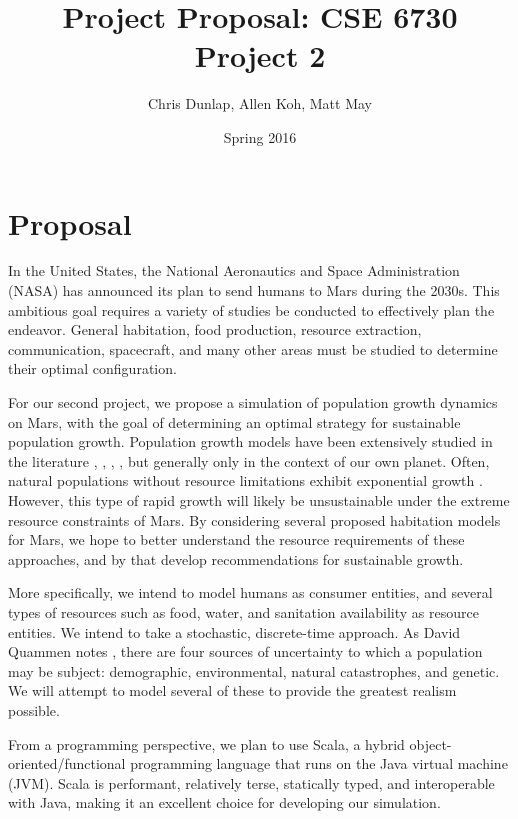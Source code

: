 \documentclass[12pt]{article}
\title{Project Proposal: CSE 6730 Project 2}
\author{Chris Dunlap, Allen Koh, Matt May}
\date{Spring 2016}
\begin{document}
\begin{titlepage}
  \maketitle
  \thispagestyle{empty}
\end{titlepage}

\newpage
  \tableofcontents
  \thispagestyle{empty}
\newpage

\section{Proposal}
\label{sec:proposal}

In the United States, the National Aeronautics and Space Administration (NASA)
has announced its plan to send humans to Mars during the 2030s. This ambitious
goal requires a variety of studies be conducted to effectively plan the
endeavor. General habitation, food production, resource extraction,
communication, spacecraft, and many other areas must be studied to determine
their optimal configuration.

For our second project, we propose a simulation of population growth dynamics on
Mars, with the goal of determining an optimal strategy for sustainable
population growth. Population growth models have been extensively studied in the
literature \cite{clark1967population}, \cite{caswell2001matrix},
\cite{meadows1992beyond}, \cite{boserup1983population},
\cite{ehrlich1971impact} but generally only in the context of our own planet.
Often, natural populations without resource limitations exhibit exponential
growth \cite{audesirk1996biology}. However, this type of rapid growth will
likely be unsustainable under the extreme resource constraints of Mars.
By considering several proposed habitation models for Mars, we hope to better
understand the resource requirements of these approaches, and by that develop
recommendations for sustainable growth.

More specifically, we intend to model humans as consumer entities, and several
types of resources such as food, water, and sanitation availability as resource
entities. We intend to take a stochastic, discrete-time approach. As David
Quammen notes \cite{quammen1996song}, there are four sources of uncertainty to
which a population may be subject: demographic, environmental, natural
catastrophes, and genetic. We will attempt to model several of these to
provide the greatest realism possible.

From a programming perspective, we plan to use Scala, a hybrid
object-oriented/functional programming language that runs on the Java virtual
machine (JVM). Scala is performant, relatively terse, statically typed, and
interoperable with Java, making it an excellent choice for developing our
simulation.

\clearpage
{}

\end{document}
